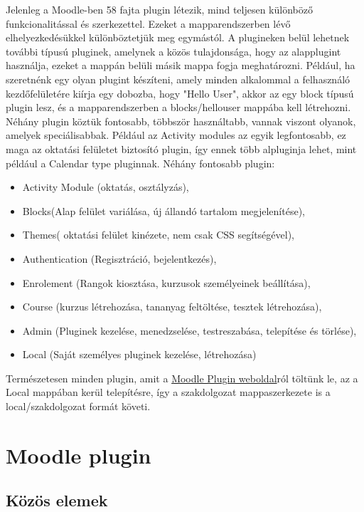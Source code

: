 Jelenleg a Moodle-ben 58 fajta plugin létezik, mind teljesen különböző funkcionalitással és szerkezettel. Ezeket a mapparendszerben lévő elhelyezkedésükkel különböztetjük meg egymástól. A plugineken belül lehetnek további típusú pluginek, amelynek a közös tulajdonsága, hogy az alapplugint használja, ezeket a mappán belüli másik mappa fogja meghatározni. Például, ha szeretnénk egy olyan plugint készíteni, amely minden alkalommal a felhasználó kezdőfelületére kiírja egy dobozba, hogy "Hello User", akkor az egy block típusú plugin lesz, és a mapparendszerben a blocks/hellouser mappába kell létrehozni. Néhány plugin köztük fontosabb, többször használtabb, vannak viszont olyanok, amelyek speciálisabbak. Például az Activity modules az egyik legfontosabb, ez maga az oktatási felületet biztosító plugin, így ennek több alpluginja lehet, mint például a Calendar type pluginnak. Néhány fontosabb plugin: 
\begin{itemize}
    \item Activity Module (oktatás, osztályzás), 
    \item Blocks(Alap felület variálása, új állandó tartalom megjelenítése), 
    \item Themes( oktatási felület kinézete, nem csak CSS segítségével), 
    \item Authentication (Regisztráció, bejelentkezés), 
    \item Enrolement (Rangok kiosztása, kurzusok személyeinek beállítása), 
    \item Course (kurzus létrehozása, tananyag feltöltése, tesztek létrehozása), 
    \item Admin (Pluginek kezelése, menedzselése, testreszabása, telepítése és törlése), 
    \item Local (Saját személyes pluginek kezelése, létrehozása) 
\end{itemize}

Természetesen minden plugin, amit a \href{https://moodle.org/plugins/}{Moodle Plugin weboldal}ról töltünk le, az a Local mappában kerül telepítésre, így a szakdolgozat mappaszerkezete is a local/szakdolgozat formát követi.

\section{Moodle plugin}

\subsection{Közös elemek}

